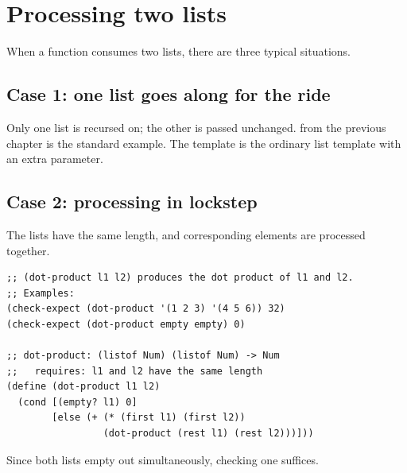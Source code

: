 \section{Processing two lists}

When a function consumes two lists, there are three typical situations.

\subsection{Case 1: one list goes along for the ride}
Only one list is recursed on; the other is passed unchanged. 
from the previous chapter is the standard example. The template is the
ordinary list template with an extra parameter.

\subsection{Case 2: processing in lockstep}
The lists have the same length, and corresponding elements are processed
together.
\begin{lstlisting}[style=racket]
;; (dot-product l1 l2) produces the dot product of l1 and l2.
;; Examples:
(check-expect (dot-product '(1 2 3) '(4 5 6)) 32)
(check-expect (dot-product empty empty) 0)

;; dot-product: (listof Num) (listof Num) -> Num
;;   requires: l1 and l2 have the same length
(define (dot-product l1 l2)
  (cond [(empty? l1) 0]
        [else (+ (* (first l1) (first l2))
                 (dot-product (rest l1) (rest l2)))]))
\end{lstlisting}
\begin{center}
\end{center}
Since both lists empty out simultaneously, checking one suffices.

